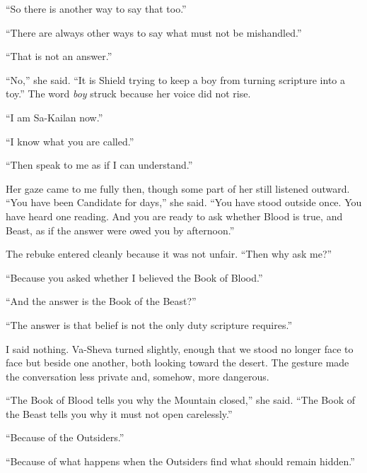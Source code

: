 ``So there is another way to say that too.''\par

``There are always other ways to say what must not be mishandled.''\par

``That is not an answer.''\par

``No,'' she said. ``It is Shield trying to keep a boy from turning scripture into a toy.'' The word \textit{boy} struck because her voice did not rise.\par

``I am Sa-Kailan now.''\par

``I know what you are called.''\par

``Then speak to me as if I can understand.''\par

Her gaze came to me fully then, though some part of her still listened outward. ``You have been Candidate for days,'' she said. ``You have stood outside once. You have heard one reading. And you are ready to ask whether Blood is true, and Beast, as if the answer were owed you by afternoon.''\par

The rebuke entered cleanly because it was not unfair. ``Then why ask me?''\par

``Because you asked whether I believed the Book of Blood.''\par

``And the answer is the Book of the Beast?''\par

``The answer is that belief is not the only duty scripture requires.''\par

I said nothing. Va-Sheva turned slightly, enough that we stood no longer face to face but beside one another, both looking toward the desert. The gesture made the conversation less private and, somehow, more dangerous.\par

``The Book of Blood tells you why the Mountain closed,'' she said. ``The Book of the Beast tells you why it must not open carelessly.''\par

``Because of the Outsiders.''\par

``Because of what happens when the Outsiders find what should remain hidden.''\par

